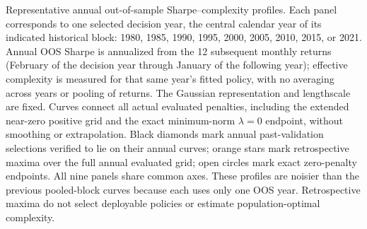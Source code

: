 \caption{Representative annual out-of-sample Sharpe--complexity profiles.
Each panel corresponds to one selected decision year, the central calendar
year of its indicated historical block: 1980, 1985, 1990, 1995, 2000,
2005, 2010, 2015, or 2021. Annual OOS Sharpe is annualized from the 12
subsequent monthly returns (February of the decision year through January
of the following year); effective complexity is measured for that same
year's fitted policy, with no averaging across years or pooling of returns.
The Gaussian representation and lengthscale are fixed. Curves connect all
actual evaluated penalties, including the extended near-zero positive
grid and the exact minimum-norm $\lambda=0$ endpoint, without smoothing
or extrapolation. Black diamonds mark annual past-validation selections
verified to lie on their annual curves; orange stars mark retrospective
maxima over the full annual evaluated grid; open circles mark exact
zero-penalty endpoints. All nine panels share common axes. These profiles
are noisier than the previous pooled-block curves because each uses only
one OOS year. Retrospective maxima do not select deployable policies or
estimate population-optimal complexity.}
